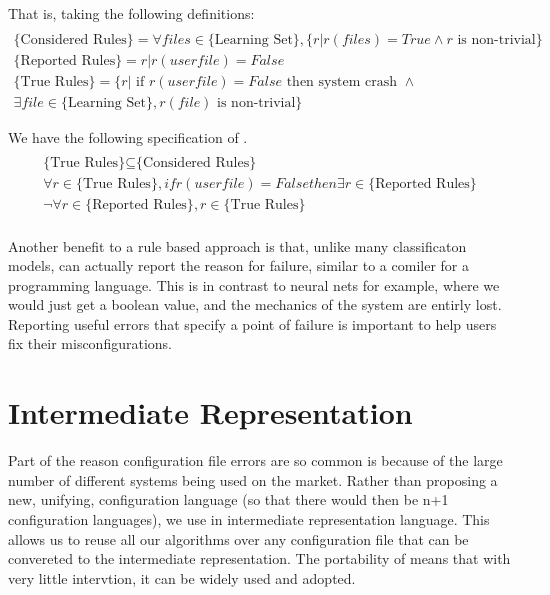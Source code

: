 That is, taking the following definitions:
\begin{multline*}\\
\text{\{Considered Rules\}} = \forall files \in \text{\{Learning Set\}}, \{ r | r(files) = True \land r \text{ is non-trivial}\}\\
\text{\{Reported Rules\}} = {r | r(userfile)=False } \\
\text{\{True Rules\}} = \{r | \text{ if } r(userfile)=False \text{ then system crash } \land \\
   \exists file \in \text{\{Learning Set\}}, r(file) \text{ is non-trivial}\}
\end{multline*}

We have the following specification of \app.
\begin{multline*}\\
\text{\{True Rules\}} \subseteq \text{\{Considered Rules\}} \\
\forall r \in \text{\{True Rules\}}, if r(userfile)=False then \exists r \in \text{\{Reported Rules\}} \\
\neg \forall r \in \text{\{Reported Rules\}}, r \in \text{\{True Rules\}} \\
\end{multline*}

Another benefit to a rule based approach is that, unlike many classificaton models, \app can actually report the reason for failure, similar to a comiler for a programming language.
This is in contrast to neural nets for example, where we would just get a boolean value, and the mechanics of the system are entirly lost.
Reporting useful errors that specify a point of failure is important to help users fix their misconfigurations.

\section{Intermediate Representation}

Part of the reason configuration file errors are so common is because of the large number of different systems being used on the market.
Rather than proposing a new, unifying, configuration language (so that there would then be n+1 configuration languages), we use in intermediate representation language.
This allows us to reuse all our algorithms over any configuration file that can be convereted to the intermediate representation.
The portability of \app means that with very little intervtion, it can be widely used and adopted.

